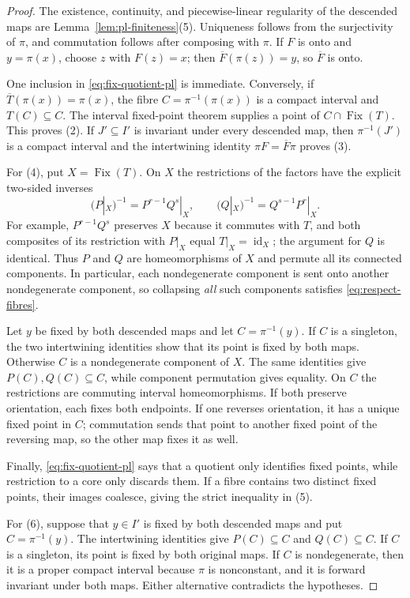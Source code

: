 \documentclass[11pt]{article}
\theoremstyle{definition}
\theoremstyle{remark}
\newcommand{\Fix}{\operatorname{Fix}}
\newcommand{\id}{\operatorname{id}}
\begin{document}
\begin{proof}
The existence, continuity, and piecewise-linear regularity of the descended maps are
Lemma~\ref{lem:pl-finiteness}(5).  Uniqueness follows from the
surjectivity of $\pi$, and commutation follows after composing with $\pi$.
If $F$ is onto and $y=\pi(x)$, choose $z$ with $F(z)=x$; then
$\overline F(\pi(z))=y$, so $\overline F$ is onto.

One inclusion in \eqref{eq:fix-quotient-pl} is immediate.  Conversely,
if $\overline T(\pi(x))=\pi(x)$, the fibre
$C=\pi^{-1}(\pi(x))$ is a compact interval and $T(C)\subseteq C$.
The interval fixed-point theorem supplies a point of $C\cap\Fix(T)$.
This proves (2).  If $J'\subseteq I'$ is invariant under every descended
map, then $\pi^{-1}(J')$ is a compact interval and the intertwining identity
$\pi F=\overline F\pi$ proves (3).

For (4), put $X=\Fix(T)$.  On $X$ the restrictions of the factors have the
explicit two-sided inverses
\[
 (P|_X)^{-1}=P^{r-1}Q^s|_X,\qquad
 (Q|_X)^{-1}=Q^{s-1}P^r|_X.
\]
For example, $P^{r-1}Q^s$ preserves $X$ because it commutes with $T$, and
both composites of its restriction with $P|_X$ equal $T|_X=\id_X$; the
argument for $Q$ is identical.  Thus $P$ and $Q$ are homeomorphisms of $X$
and permute all its connected components.  In particular, each
nondegenerate component is sent onto another nondegenerate component, so
collapsing \emph{all} such components satisfies
\eqref{eq:respect-fibres}.

Let $y$ be fixed by both descended maps and let $C=\pi^{-1}(y)$.  If $C$ is
a singleton, the two intertwining identities show that its point is fixed
by both maps.  Otherwise $C$ is a nondegenerate component of $X$.
The same identities give $P(C),Q(C)\subseteq C$, while component permutation
gives equality.  On $C$ the restrictions are commuting interval
homeomorphisms.  If both preserve orientation, each fixes both endpoints.
If one reverses orientation, it has a unique fixed point in $C$;
commutation sends that point to another fixed point of the reversing map,
so the other map fixes it as well.

Finally, \eqref{eq:fix-quotient-pl} says that a quotient only identifies
fixed points, while restriction to a core only discards them.  If a fibre
contains two distinct fixed points, their images coalesce, giving the strict
inequality in (5).

For (6), suppose that $y\in I'$ is fixed by both descended maps and put
$C=\pi^{-1}(y)$.  The intertwining identities give
$P(C)\subseteq C$ and $Q(C)\subseteq C$.  If $C$ is a singleton, its point is
fixed by both original maps.  If $C$ is nondegenerate, then it is a proper
compact interval because $\pi$ is nonconstant, and it is forward invariant
under both maps.  Either alternative contradicts the hypotheses.
\end{proof}
\end{document}

